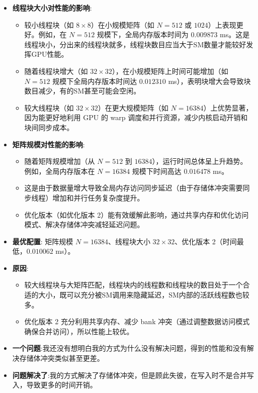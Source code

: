 \documentclass{SYSUReport}
\begin{document}
\begin{itemize}
  \item \textbf{线程块大小对性能的影响}:
  \begin{itemize}
    \item 较小线程块（如 $8\times8$）在小规模矩阵（如 $N=512$ 或 $1024$）上表现更好。例如，在 $N=512$ 规模下，全局内存版本时间为 $0.009873$ ms。这是线程块小，分出来的线程块就多，线程块数目应当大于SM数量才能较好发挥GPU性能。
    \item 随着线程块增大（如 $32\times32$），在小规模矩阵上时间可能增加（如 $N=512$ 规模下全局内存版本时间达 $0.012310$ ms），表明块增大会导致块数目减少，有的SM甚至可能会空闲。
    \item 较大线程块（如 $32\times32$）在更大规模矩阵（如 $N=16384$）上优势显著，因为能更好地利用 GPU 的 warp 调度和并行资源，减少内核启动开销和块间同步成本。
  \end{itemize}
  
  \item \textbf{矩阵规模对性能的影响}:
  \begin{itemize}
    \item 随着矩阵规模增加（从 $N=512$ 到 $16384$），运行时间总体呈上升趋势。例如，全局内存版本在 $N=16384$ 规模下时间高达 $0.016478$ ms。
    \item 这是由于数据量增大导致全局内存访问同步延迟（由于存储体冲突需要同步线程）增加和并行任务复杂度提升。
    \item 优化版本（如优化版本 2）能有效缓解此影响，通过共享内存和优化访问模式、解决存储体冲突减轻延迟问题。
  \end{itemize}
  
  \item \textbf{最优配置}: 矩阵规模 $N=16384$、线程块大小 $32\times32$、优化版本 2（时间最低，$0.010062$ ms）。
  
  \item \textbf{原因}:
  \begin{itemize}
    \item 较大线程块与大矩阵匹配，线程块内的线程数和线程块的数目处于一个合适的大小，既可以充分被SM调用来隐藏延迟，SM内部的活跃线程数也较多。
    \item 优化版本 2 充分利用共享内存、减少 bank 冲突（通过调整数据访问模式确保合并访问），所以性能上较优。
  \end{itemize}
  \item \textbf{一个问题}:我还没有想明白我的方式为什么没有解决问题，得到的性能和没有解决存储体冲突类似甚至更差。
  \item \textbf{问题解决了}:我的方式解决了存储体冲突，但是顾此失彼，在写入时不是合并写入，导致更多的时间开销。
\end{itemize}
\end{document}
